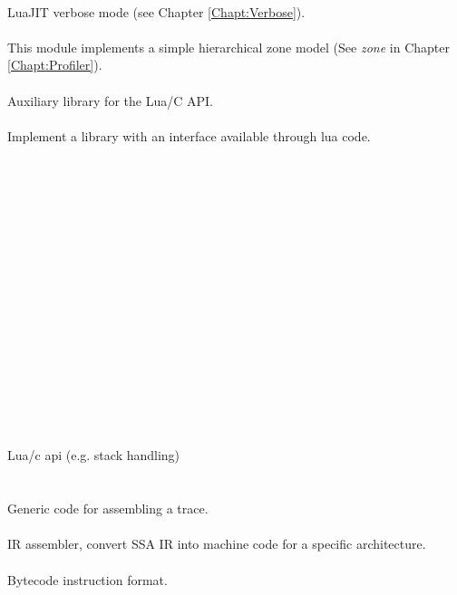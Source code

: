 \\
LuaJIT verbose mode (see Chapter \ref{Chapt:Verbose}).\\
\\
This module implements a simple hierarchical zone model
(See \emph{zone} in Chapter \ref{Chapt:Profiler}).\\
\\
Auxiliary library for the Lua/C API.\\
\\
Implement a library with an interface available through lua code.\\
\\
\\
\\
\\
\\
\\
\\
\\
\\
\\
\\
\\
\\
\\
\\
\\
\\
Lua/c api (e.g. stack handling)\\
\\
\\
Generic code for assembling a trace.\\
\\
IR assembler, convert SSA IR into machine code for a specific architecture.\\
\\
Bytecode instruction format.\\
\\
